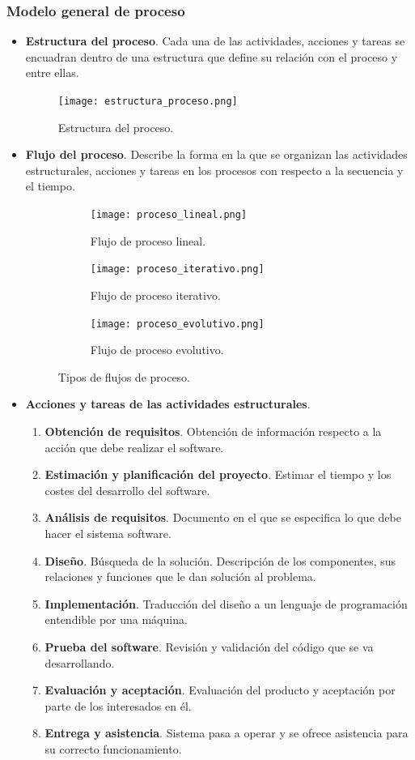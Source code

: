 \documentclass[12pt,spanish]{article}
\begin{document}
\subsubsection{Modelo general de proceso}
\begin{itemize}
	\item \textbf{Estructura del proceso}. Cada una de las actividades, acciones y tareas se encuadran dentro de una estructura que define su relación con el proceso y entre ellas.
		\begin{figure}[H]
		\centering
		\texttt{[image: estructura\_proceso.png]}
		\caption{Estructura del proceso.}
		\end{figure}	
	\item \textbf{Flujo del proceso}. Describe la forma en la que se organizan las actividades estructurales, acciones y tareas en los procesos con respecto a la secuencia y el tiempo.
		\begin{figure}[H]
			\centering
			\begin{subfigure}[H]{0.5\textwidth}
			\texttt{[image: proceso\_lineal.png]}
			\caption{Flujo de proceso lineal.}
			\end{subfigure}
			\vskip 10pt
			\begin{subfigure}[H]{0.5\textwidth}
			\texttt{[image: proceso\_iterativo.png]}
			\caption{Flujo de proceso iterativo.}
			\end{subfigure}
			
			\begin{subfigure}[H]{0.5\textwidth}
			\texttt{[image: proceso\_evolutivo.png]}
			\caption{Flujo de proceso evolutivo.}
			\end{subfigure}
			\caption{Tipos de flujos de proceso.}
		\end{figure}
	\item \textbf{Acciones y tareas de las actividades estructurales}.
		\begin{enumerate}
			\item \textbf{Obtención de requisitos}. Obtención de información respecto a la acción que debe realizar el software.
			\item \textbf{Estimación y planificación del proyecto}. Estimar el tiempo y los costes del desarrollo del software.
			\item \textbf{Análisis de requisitos}. Documento en el que se especifica lo que debe hacer el sistema software.
			\item \textbf{Diseño}. Búsqueda de la solución. Descripción de los componentes, sus relaciones y funciones que le dan solución al problema.
			\item \textbf{Implementación}. Traducción del diseño a un lenguaje de programación entendible por una máquina.
			\item \textbf{Prueba del software}. Revisión y validación del código que se va desarrollando.
			\item \textbf{Evaluación y aceptación}. Evaluación del producto y aceptación por parte de los interesados en él.
			\item \textbf{Entrega y asistencia}. Sistema pasa a operar y se ofrece asistencia para su correcto funcionamiento.
		\end{enumerate}
\end{itemize}
\end{document}
